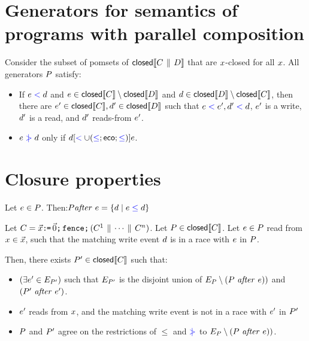 \section{Generators for semantics of programs with parallel composition}
\begin{lemma}\label{pargen}
Consider the subset of pomsets of $\textsf{closed}\llbracket C \,\mathbin{\|}\, D\rrbracket$ that are  $x$-closed for all $x$.  All generators $P$  satisfy:

\begin{itemize}
\item  If $e\mathrel{{\color{blue}<}}d$ and $e \in \textsf{closed}\llbracket C\rrbracket \setminus \textsf{closed}\llbracket D\rrbracket$ and  $d \in \textsf{closed}\llbracket D\rrbracket \setminus \textsf{closed}\llbracket C\rrbracket$, then there are $e' \in \textsf{closed}\llbracket C\rrbracket, d' \in \textsf{closed}\llbracket D\rrbracket$ such that 
$e \mathrel{{\color{blue}<}} e', d' \mathrel{{\color{blue}<}} d$, 
$e'$ is a write, $d'$ is a read, and $d'$ reads-from $e'$.

\item $e \mathrel{{\color{blue}\mkern4mu\mid\!\!\!>}} d$ only if $ d  [\mathrel{{\color{blue}<}} \cup (\mathrel{{\color{blue}\leq}}; \mathrel{\mathsf{eco}};\mathrel{{\color{blue}\leq}})]  e$.


\end{itemize}


\end{lemma}

\section{Closure properties}

\begin{definition}
Let $e \in P$.  Then:$ P \mathit{after}\ e = \{ d \mid e \mathrel{{\color{blue}\leq}} d \}$
\end{definition}

\begin{lemma}\label{inputen}
Let $C = \vec{x}\texttt{:}\mkern-1mu\texttt{=}\,\vec{0}\texttt{;}\,
    \texttt{fence}\texttt{;}\,
    (C^1 \,\mathbin{\|}\, \cdots \,\mathbin{\|}\, C^n)$.
Let $P \in \textsf{closed}\llbracket C\rrbracket$.  
Let $e \in P$ read from $x \in \vec{x}$, such that the matching write event $d$ is in a race with $e$ in $P$. 

 Then, there exists $P' \in \textsf{closed}\llbracket C\rrbracket$ such that:
\begin{itemize}
\item $(\exists e' \in E_{P'})$ such that $E_{P'}$ is the disjoint union of  $\Event_{\aPS} \setminus  (\aPS\ \after\ \aEv))$ and $(\bPS\ \after\ \aEv')$.
\item $e'$ reads from $x$, and the matching write event is not in a race with $e'$ in $P'$
\item $P$ and $P'$ agree on the restrictions of $\le$ and $\mathrel{{\color{blue}\mkern4mu\mid\!\!\!>}}$ to $\Event_{\aPS} \setminus  (\aPS\ \after\ \aEv))$.
\end{itemize}
\end{lemma}

